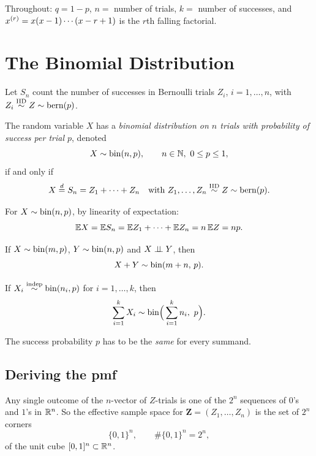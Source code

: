 \noindent Throughout: $q = 1-p$, $n = $ number of trials, $k = $ number of successes,
and $x^{(r)} = x(x-1)\cdots(x-r+1)$ is the $r$th falling factorial.

\section{The Binomial Distribution}

Let $S_n$ count the number of successes in Bernoulli trials $Z_i$, $i = 1,\dots,n$, with $Z_i \overset{\text{IID}}{\sim} Z \sim \operatorname{bern}(p)$.

\begin{definition}
The random variable $X$ has a \emph{binomial distribution on $n$ trials with probability of success per trial $p$}, denoted
\[
X \sim \bin(n,p), \qquad n \in \N,\ 0 \le p \le 1,
\]
if and only if
\[
X \overset{d}{=} S_n = Z_1 + \cdots + Z_n \quad \text{with } Z_1,\dots,Z_n \overset{\text{IID}}{\sim} Z \sim \operatorname{bern}(p).
\]
\end{definition}

For $X \sim \operatorname{bin}(n,p)$, by linearity of expectation:
\[
\mathbb{E} X = \mathbb{E} S_n = \mathbb{E} Z_1 + \cdots + \mathbb{E} Z_n = n\,\mathbb{E} Z = np.
\]

\begin{proposition}
If $X \sim \operatorname{bin}(m,p)$, $Y \sim \operatorname{bin}(n,p)$ and $X \perp\!\!\!\perp Y$, then
\[
X + Y \sim \operatorname{bin}(m+n,\,p).
\]
\end{proposition}

\begin{corollary}
If $X_i \overset{\text{indep}}{\sim} \operatorname{bin}(n_i, p)$ for $i = 1,\dots,k$, then
\[
\sum_{i=1}^{k} X_i \sim \operatorname{bin}\!\Big(\sum_{i=1}^{k} n_i,\ p\Big).
\]
\end{corollary}
\begin{remark}
The success probability $p$ has to be the \emph{same} for every summand.
\end{remark}

\subsection{Deriving the pmf}

Any single outcome of the $n$-vector of $Z$-trials is one of the $2^n$ sequences of $0$'s and $1$'s in $\mathbb{R}^n$.
So the effective sample space for $\mathbf{Z} = (Z_1,\dots,Z_n)$ is the set of $2^n$ corners
\[
\{0,1\}^n, \qquad \#\{0,1\}^n = 2^n,
\]
of the unit cube $[0,1]^n \subset \mathbb{R}^n$.

